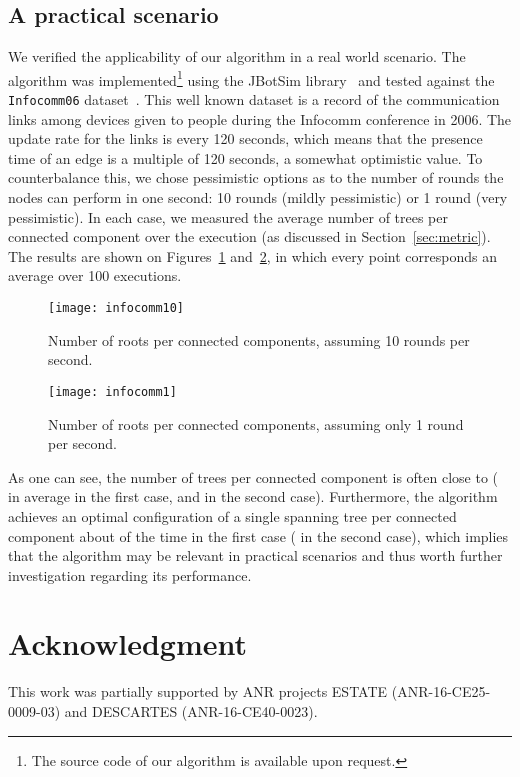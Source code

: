\documentclass[twocolumn]{article}
\begin{document}
\subsection{A practical scenario}
We verified the applicability of our algorithm in a real world
scenario. The algorithm was implemented\footnote{The source code of our algorithm is available upon request.} using the JBotSim library~\cite{C13} and 
tested against the {\tt Infocomm06} dataset~\cite{infocom06}. This well known dataset is a record of the communication links among devices given to
  people during the {\sc Infocomm} conference in 2006.
The update rate for the links is every 120 seconds, which means that
the presence time of an edge is a multiple of 120 seconds, a somewhat
optimistic value. 
To counterbalance this, we chose pessimistic options as to the number of 
rounds the nodes can perform in one second: 10 rounds (mildly pessimistic) or 1 round (very pessimistic).
In each case, we measured the average number of trees per connected
component over the execution (as discussed in Section~\ref{sec:metric}). The results are shown on Figures~\ref{fig:infocomm10} and~\ref{fig:infocomm1}, in which every point corresponds an average over 100 executions. 
\begin{figure}[h]
\center
\texttt{[image: infocomm10]}
\caption{Number of roots per connected components, assuming 10 rounds per second.}
\label{fig:infocomm10}
\end{figure}
\begin{figure}[h]
\center
\texttt{[image: infocomm1]}
\caption{Number of roots per connected components, assuming only 1 round per second.}
\label{fig:infocomm1}
\end{figure}

As one can see, the number of trees per connected component is often close to  ( in average in the first case, and  in the second case). Furthermore, the algorithm achieves an optimal configuration of a single spanning tree per connected component  about  of the time in the first case ( in the second case), which implies that the algorithm may be relevant in practical scenarios and thus worth further investigation regarding its performance.
 




















\section*{Acknowledgment}
{\small This work was partially supported by ANR projects ESTATE (ANR-16-CE25-0009-03) and DESCARTES (ANR-16-CE40-0023).
}



\end{document}
